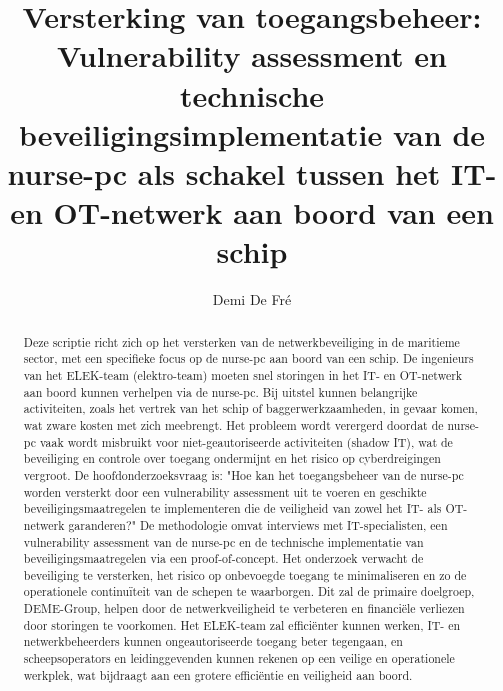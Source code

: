 \documentclass{hogent-article}
\title{Versterking van toegangsbeheer: Vulnerability assessment en 
technische beveiligingsimplementatie van de nurse-pc als schakel tussen het IT- en OT-netwerk aan boord van een schip}
\author{Demi De Fré}
\begin{document}
\begin{abstract}
  Deze scriptie richt zich op het versterken van de netwerkbeveiliging in de maritieme sector, met een specifieke focus op de 
  nurse-pc aan boord van een schip. De ingenieurs van het ELEK-team (elektro-team) moeten snel storingen in het IT- en OT-netwerk 
  aan boord kunnen verhelpen via de nurse-pc. Bij uitstel kunnen belangrijke activiteiten, zoals het vertrek van het schip of 
  baggerwerkzaamheden, in gevaar komen, wat zware kosten met zich meebrengt. Het probleem wordt verergerd doordat de nurse-pc 
  vaak wordt misbruikt voor niet-geautoriseerde activiteiten (shadow IT), wat de beveiliging en controle over toegang ondermijnt 
  en het risico op cyberdreigingen vergroot. De hoofdonderzoeksvraag is: "Hoe kan het toegangsbeheer van de nurse-pc worden 
  versterkt door een vulnerability assessment uit te voeren en geschikte beveiligingsmaatregelen te implementeren die de veiligheid 
  van zowel het IT- als OT-netwerk garanderen?" De methodologie omvat interviews met IT-specialisten, een vulnerability assessment 
  van de nurse-pc en de technische implementatie van beveiligingsmaatregelen via een proof-of-concept. Het onderzoek verwacht de 
  beveiliging te versterken, het risico op onbevoegde toegang te minimaliseren en zo de operationele continuïteit van de schepen 
  te waarborgen. Dit zal de primaire doelgroep, DEME-Group, helpen door de netwerkveiligheid te verbeteren en financiële verliezen 
  door storingen te voorkomen. Het ELEK-team zal efficiënter kunnen werken, IT- en netwerkbeheerders kunnen ongeautoriseerde toegang 
  beter tegengaan, en scheepsoperators en leidinggevenden kunnen rekenen op een veilige en operationele werkplek, wat bijdraagt aan 
  een grotere efficiëntie en veiligheid aan boord.
\end{abstract}

\tableofcontents



\printbibliography[heading=bibintoc]
\end{document}
